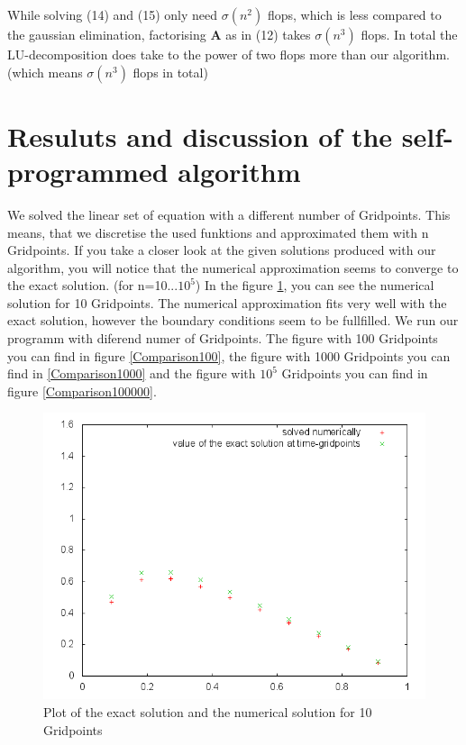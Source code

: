 \documentclass[10pt,a4paper]{article}
\begin{document}
While solving (14) and (15) only need $\sigma(n^2)$ flops, which is less compared to the gaussian elimination, factorising $\mathbf{A}$ as in (12) takes $\sigma(n^3)$ flops. In total the LU-decomposition does take to the power of two flops more than our algorithm. (which means $\sigma(n^3)$ flops in total)


\section{Resuluts and discussion of the self-programmed algorithm}

We solved the linear set of equation with a different number of Gridpoints. This means, that we discretise the used funktions and approximated them with n Gridpoints. If you take a closer look at the given solutions produced with our algorithm, you will notice that the numerical approximation seems to converge to the exact solution. (for n=10...$10^5$) In the figure \ref{Comparison10}, you can see the numerical solution for 10 Gridpoints. The numerical approximation fits very well with the exact solution, however the boundary conditions seem to be fullfilled. We run our programm with diferend numer of Gridpoints. The figure with 100 Gridpoints you can find in figure \ref{Comparison100}, the figure with 1000 Gridpoints you can find in \ref{Comparison1000} and the figure with $10^5$ Gridpoints you can find in figure \ref{Comparison100000}. 



\begin{figure}[h]
\centering
\includegraphics[scale=0.5]{Comparisonplot10.png}
\caption{Plot of the exact solution and the numerical solution for 10 Gridpoints}
\label{Comparison10}
\end{figure}
\end{document}
